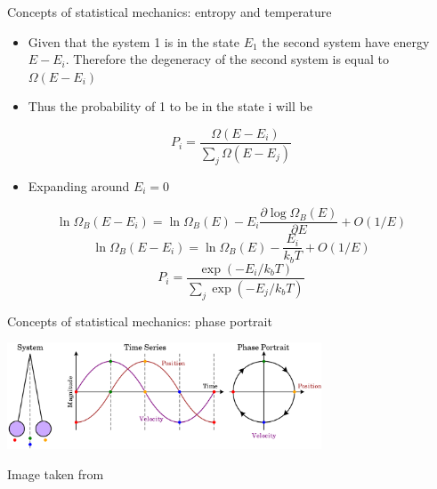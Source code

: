 \documentclass{beamer}
\begin{document}
\begin{frame}{Concepts of statistical mechanics: entropy and temperature \cite{frenkel2001understanding}}
\begin{itemize}
\item Given that the system 1 is in the state $E_{1}$ the second system have energy $E-E_{i}$. Therefore the degeneracy of the second system is equal to $\Omega(E-E_{i})$
\item Thus the probability of 1 to be in the state i will be 
\end{itemize}

\begin{equation*}
P_{i}=\dfrac{\Omega(E-E_{i})}{\sum_{j}\Omega(E-E_{j})}
\end{equation*}
\begin{itemize}

\item Expanding around $E_{i}=0$
\end{itemize}
\begin{equation*}
\ln\Omega_{B}(E-E_{i})=\ln\Omega_{B}(E)-E_{i}\frac{\partial\log\Omega_{B}(E)}{\partial E}+O(1/E)
\end{equation*}
\begin{equation*}
\ln\Omega_{B}(E-E_{i})=\ln\Omega_{B}(E)-\dfrac{E_{i}}{k_{b}T}+O(1/E)
\end{equation*}
\begin{equation*}
P_{i}=\dfrac{\exp(-E_{i}/k_{b}T)}{\sum_{j}\exp(-E_{j}/k_{b}T)}
\end{equation*}


\end{frame}


\begin{frame}{Concepts of statistical mechanics: phase portrait \cite{peliti2011statistical}}
 \begin{center}
     \includegraphics[width=0.7\textwidth]{Pic/Pendulum_phase_portrait_illustration.png}
\end{center}
\begin{center}
Image taken from \cite{PBC}
\end{center}




\end{frame}
\end{document}
